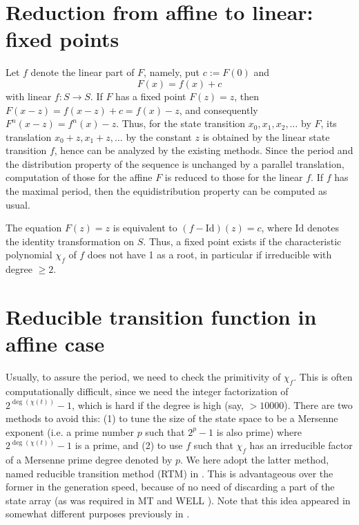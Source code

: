 \documentclass{svmult}
\begin{document}
\section{Reduction from affine to linear: fixed points}
\label{sec:fixed-point}
Let $f$ denote the linear part of $F$,
namely, put $c:=F(0)$ and 
\begin{equation}
F(x) = f(x) + c
\end{equation}
with linear $f: S \to S$. 
If $F$ has a fixed point
$F(z)=z$, then $F(x-z)=f(x-z)+c=f(x)-z$, and
consequently $F^n(x-z)=f^n(x)-z$.
Thus, for the state transition $x_0,x_1,x_2,\ldots$ by $F$,
its translation $x_0+z, x_1+z, \ldots$ by the constant $z$
is obtained by the linear state transition $f$, hence can be analyzed
by the existing methods. 
Since the period and the distribution property of the
sequence is unchanged by a parallel translation, 
computation of those for the affine $F$ is 
reduced to those for the linear $f$. If $f$ has the maximal period,
then the equidistribution property can be computed as usual.

The equation $F(z)=z$ is equivalent to $(f-\textrm{Id})(z)=c$,
where $\textrm{Id}$ denotes the identity transformation on 
$S$.
Thus, a fixed point exists 
if the characteristic polynomial $\chi_f$ of $f$ 
does not have 1 as a root, 
in particular if irreducible with degree $\geq 2$.

\section{Reducible transition function in affine case}
\label{sec:RTM}
Usually, to assure the period, we need to check 
the primitivity of $\chi_f$.
This is often computationally difficult, 
since we need the integer factorization of
$2^{\deg(\chi(t))}-1$, which is hard if the degree is high (say, $>10000$).
There are two methods to avoid this: (1) to tune the size of the state space
to be a Mersenne exponent (i.e. a prime number $p$
such that $2^p-1$ is also prime) where $2^{\deg(\chi(t))}-1$ is a prime,
and (2) to use $f$ such that $\chi_f$ has an irreducible factor
of a Mersenne prime degree denoted by $p$. We here adopt the latter
method, named reducible transition method (RTM) in \cite{SFMT}. 
This is advantageous over
the former in the generation speed, because of no need of discarding
a part of the state array (as was required in MT \cite{MT} and WELL \cite{WELL}).
Note that this idea appeared in somewhat different purposes previously in 
 \cite{FUSHIMI90}\cite{BRENT}\cite{BRENT-PRIM}.
 
\end{document}

